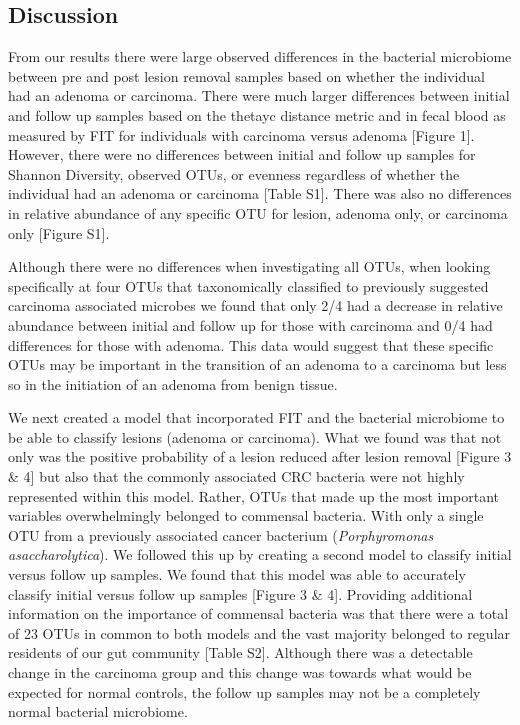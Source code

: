 \documentclass[12pt,]{article}
\begin{document}
\newpage

\subsection{Discussion}\label{discussion}

From our results there were large observed differences in the bacterial
microbiome between pre and post lesion removal samples based on whether
the individual had an adenoma or carcinoma. There were much larger
differences between initial and follow up samples based on the thetayc
distance metric and in fecal blood as measured by FIT for individuals
with carcinoma versus adenoma {[}Figure 1{]}. However, there were no
differences between initial and follow up samples for Shannon Diversity,
observed OTUs, or evenness regardless of whether the individual had an
adenoma or carcinoma {[}Table S1{]}. There was also no differences in
relative abundance of any specific OTU for lesion, adenoma only, or
carcinoma only {[}Figure S1{]}.

Although there were no differences when investigating all OTUs, when
looking specifically at four OTUs that taxonomically classified to
previously suggested carcinoma associated microbes we found that only
2/4 had a decrease in relative abundance between initial and follow up
for those with carcinoma and 0/4 had differences for those with adenoma.
This data would suggest that these specific OTUs may be important in the
transition of an adenoma to a carcinoma but less so in the initiation of
an adenoma from benign tissue.

We next created a model that incorporated FIT and the bacterial
microbiome to be able to classify lesions (adenoma or carcinoma). What
we found was that not only was the positive probability of a lesion
reduced after lesion removal {[}Figure 3 \& 4{]} but also that the
commonly associated CRC bacteria were not highly represented within this
model. Rather, OTUs that made up the most important variables
overwhelmingly belonged to commensal bacteria. With only a single OTU
from a previously associated cancer bacterium (\emph{Porphyromonas
asaccharolytica}). We followed this up by creating a second model to
classify initial versus follow up samples. We found that this model was
able to accurately classify initial versus follow up samples {[}Figure 3
\& 4{]}. Providing additional information on the importance of commensal
bacteria was that there were a total of 23 OTUs in common to both models
and the vast majority belonged to regular residents of our gut community
{[}Table S2{]}. Although there was a detectable change in the carcinoma
group and this change was towards what would be expected for normal
controls, the follow up samples may not be a completely normal bacterial
microbiome.
\end{document}
